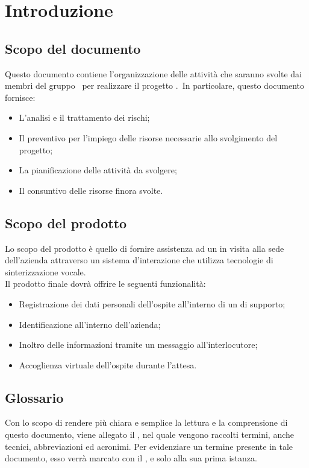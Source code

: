 \documentclass[../PianoDiProgetto.tex]{subfiles}
\begin{document}
\section{Introduzione}

	\subsection{Scopo del documento}
	Questo documento contiene l'organizzazione delle attività che saranno svolte dai membri del gruppo \kpanic\ per realizzare il progetto \progetto.\ In particolare, questo documento fornisce:

	\begin{itemize}
		\item L'analisi e il trattamento dei rischi;
		\item Il preventivo per l'impiego delle risorse necessarie allo svolgimento del progetto;
		\item La pianificazione delle attività da svolgere;
		\item Il consuntivo delle risorse finora svolte.
	\end{itemize}
	
	\subsection{Scopo del prodotto}
	Lo scopo del prodotto è quello di fornire assistenza ad un  in visita alla sede dell'azienda attraverso un sistema d'interazione che utilizza tecnologie di sinterizzazione vocale.
	\\Il prodotto finale dovrà offrire le seguenti funzionalità:
	\begin{itemize}
		\item Registrazione dei dati personali dell'ospite all'interno di un  di supporto;
		\item Identificazione  all'interno dell'azienda;
		\item Inoltro delle informazioni tramite un messaggio  all'interlocutore;
		\item Accoglienza virtuale dell'ospite durante l'attesa.
	\end{itemize}

	\subsection{Glossario}
	Con lo scopo di rendere più chiara e semplice la lettura e la comprensione di questo documento, viene allegato il \glossariov, nel quale vengono raccolti termini, anche tecnici, abbreviazioni ed acronimi. Per evidenziare un termine presente in tale documento, esso verrà marcato con il , e solo alla sua prima istanza.
	
\end{document}
